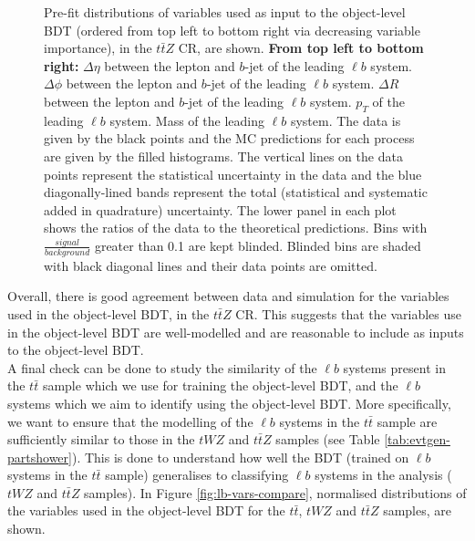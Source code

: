 \begin{figure}[htbp]
\caption{Pre-fit distributions of variables used as input to the object-level BDT (ordered from top left to bottom right via decreasing variable importance), in the $t\bar{t}Z$ CR, are shown. \textbf{From top left to bottom right:} $\Delta \eta$ between the lepton and $b$-jet of the leading $\ell b$ system. $\Delta \phi$ between the lepton and $b$-jet of the leading $\ell b$ system. $\Delta R$ between the lepton and $b$-jet of the leading $\ell b$ system. $p_{T}$ of the leading $\ell b$ system. Mass of the leading $\ell b$ system. The data is given by the black points and the MC predictions for each process are given by the filled histograms. The vertical lines on the data points represent the statistical uncertainty in the data and the blue diagonally-lined bands represent the total (statistical and systematic added in quadrature) uncertainty. The lower panel in each plot shows the ratios of the data to the theoretical predictions. Bins with $\frac{signal}{background}$ greater than 0.1 are kept blinded. Blinded bins are shaded with black diagonal lines and their data points are omitted. }
  \label{fig:4lep-ttZCR-objectbdt-vars}
\end{figure}

Overall, there is good agreement between data and simulation for the variables used in the object-level BDT, in the $t\bar{t}Z$ CR. This suggests that the variables use in the object-level BDT are well-modelled and are reasonable to include as inputs to the object-level BDT. \\

A final check can be done to study the similarity of the $\ell b$ systems present in the $t\bar{t}$ sample which we use for training the object-level BDT, and the $\ell b$ systems which we aim to identify using the object-level BDT. More specifically, we want to ensure that the modelling of the $\ell b$ systems in the $t\bar{t}$ sample are sufficiently similar to those in the $tWZ$ and $t\bar{t}Z$ samples (see Table \ref{tab:evtgen-partshower}). This is done to understand how well the BDT (trained on $\ell b$ systems in the $t\bar{t}$ sample) generalises to classifying $\ell b$ systems in the analysis ($tWZ$ and $t\bar{t}Z$ samples). In Figure \ref{fig:lb-vars-compare}, normalised distributions of the variables used in the object-level BDT for the $t\bar{t}$, $tWZ$ and $t\bar{t}Z$ samples, are shown.


